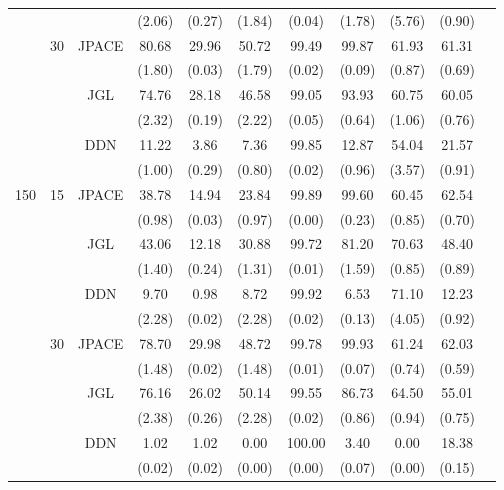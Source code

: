 \documentclass[useAMS,usenatbib,referee]{bio}
\begin{document}
{{\begin{table}[htb!]
{\begin{tabular}{||c|c|c||c|c|c|c|c|c|c||c}
 & & & (2.06) & (0.27) & (1.84) & (0.04) & (1.78) & (5.76) & (0.90) \\\cline{2-10} 
  &\multirow{6}{*}{30}  & \multirow{2}{*}{JPACE} &80.68 & 29.96 & 50.72 & 99.49 & 99.87 & 61.93 & 61.31 \\ 
& & & (1.80) & (0.03) & (1.79) & (0.02) & (0.09) & (0.87) & (0.69) \\ \cline{3-10} 
& & \multirow{2}{*}{JGL} & 74.76 & 28.18 & 46.58 & 99.05 & 93.93 & 60.75 & 60.05 \\ 
 & & & (2.32) & (0.19) & (2.22) & (0.05) & (0.64) & (1.06) & (0.76) \\ \cline{3-10} 
& & \multirow{2}{*}{DDN} & 11.22 & 3.86 & 7.36 & 99.85 & 12.87 & 54.04 & 21.57 \\ 
 & & & (1.00) & (0.29) & (0.80) & (0.02) & (0.96) & (3.57) & (0.91) \\\cline{1-10} 
\multirow{12}{*}{150}  &\multirow{6}{*}{15}  & \multirow{2}{*}{JPACE} &38.78 & 14.94 & 23.84 & 99.89 & 99.60 & 60.45 & 62.54 \\ 
& & & (0.98) & (0.03) & (0.97) & (0.00) & (0.23) & (0.85) & (0.70) \\ \cline{3-10} 
& & \multirow{2}{*}{JGL} & 43.06 & 12.18 & 30.88 & 99.72 & 81.20 & 70.63 & 48.40 \\ 
 & & & (1.40) & (0.24) & (1.31) & (0.01) & (1.59) & (0.85) & (0.89) \\ \cline{3-10} 
& & \multirow{2}{*}{DDN} & 9.70 & 0.98 & 8.72 & 99.92 & 6.53 & 71.10 & 12.23 \\ 
 & & & (2.28) & (0.02) & (2.28) & (0.02) & (0.13) & (4.05) & (0.92) \\\cline{2-10} 
  &\multirow{6}{*}{30}  & \multirow{2}{*}{JPACE} &78.70 & 29.98 & 48.72 & 99.78 & 99.93 & 61.24 & 62.03 \\ 
& & & (1.48) & (0.02) & (1.48) & (0.01) & (0.07) & (0.74) & (0.59) \\ \cline{3-10} 
& & \multirow{2}{*}{JGL} & 76.16 & 26.02 & 50.14 & 99.55 & 86.73 & 64.50 & 55.01 \\ 
 & & & (2.38) & (0.26) & (2.28) & (0.02) & (0.86) & (0.94) & (0.75) \\ \cline{3-10} 
& & \multirow{2}{*}{DDN} & 1.02 & 1.02 & 0.00 & 100.00 & 3.40 & 0.00 & 18.38 \\ 
 & & & (0.02) & (0.02) & (0.00) & (0.00) & (0.07) & (0.00) & (0.15) \\\cline{1-10} 
\end{tabular}
}
\end{table}




}}
\end{document}
